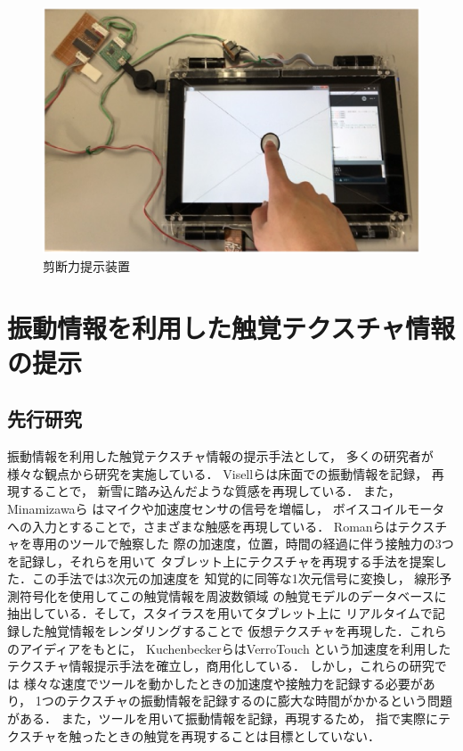 \begin{figure}[h]
\begin{center}
  \includegraphics[width=15cm]{sptablet.eps}
  \caption{剪断力提示装置}
  \label{2-3}
\end{center}
\end{figure}

\section{振動情報を利用した触覚テクスチャ情報の提示}

\subsection{先行研究\label{2-4-1}}
振動情報を利用した触覚テクスチャ情報の提示手法として，
多くの研究者が様々な観点から研究を実施している．
Visellら\cite{visell2009toward}は床面での振動情報を記録，
再現することで，
新雪に踏み込んだような質感を再現している．
また，Minamizawaら\cite{minamizawa2012techtile}
はマイクや加速度センサの信号を増幅し，
ボイスコイルモータへの入力とすることで，さまざまな触感を再現している．
Romanら\cite{romano2012creating}はテクスチャを専用のツールで触察した
際の加速度，位置，時間の経過に伴う接触力の3つを記録し，それらを用いて
タブレット上にテクスチャを再現する手法を提案した．この手法では3次元の加速度を
知覚的に同等な1次元信号に変換し，
線形予測符号化を使用してこの触覚情報を周波数領域
の触覚モデルのデータベースに抽出している．そして，スタイラスを用いてタブレット上に
リアルタイムで記録した触覚情報をレンダリングすることで
仮想テクスチャを再現した．これらのアイディアをもとに，
KuchenbeckerらはVerroTouch\cite{VerroTouch}
という加速度を利用したテクスチャ情報提示手法を確立し，商用化している．
しかし，これらの研究では
様々な速度でツールを動かしたときの加速度や接触力を記録する必要があり，
1つのテクスチャの振動情報を記録するのに膨大な時間がかかるという問題がある．
また，ツールを用いて振動情報を記録，再現するため，
指で実際にテクスチャを触ったときの触覚を再現することは目標としていない．


